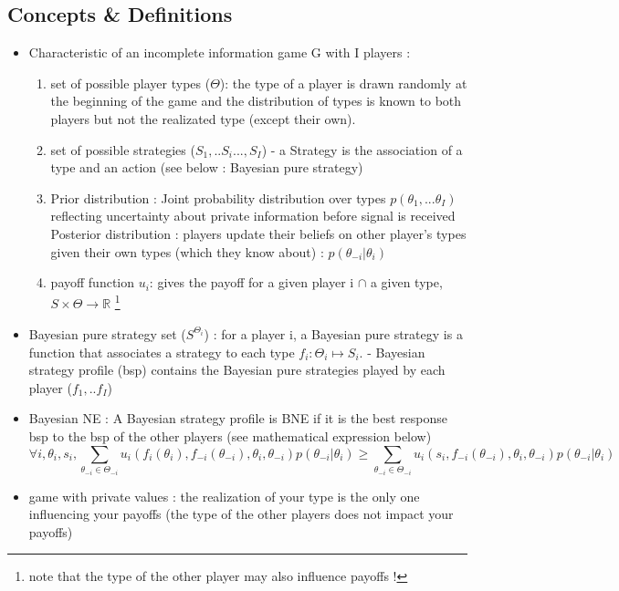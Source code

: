\documentclass{article}
\begin{document}
\subsection{Concepts \& Definitions}
\begin{itemize}
    \item Characteristic of an incomplete information game G with I players : 
    \begin{enumerate}
        \item set of possible player types ($\Theta$): the type of a player is drawn randomly at the beginning of the game and the distribution of types is known to both players but not the realizated type (except their own). 
        \item set of possible strategies ($S_1,..S_i...,S_I$)
        \subitem - a Strategy is the association of a type and an action (see below : Bayesian pure strategy)
        \item Prior distribution : Joint probability distribution over types $p(\theta_1,...\theta_I)$ reflecting uncertainty about private information before signal is received
        \subitem Posterior distribution : players update their beliefs on other player's types given their own types (which they know about) : $p(\theta_{-i}|\theta_i)$
        \item payoff function $u_i$: gives the payoff for a given player i $\cap$ a given type, $S \times\Theta\rightarrow \mathbb{R}$ \footnote{note that the type of the other player may also influence payoffs !}
    \end{enumerate} 
    \item Bayesian pure strategy set ($S^{\Theta_i}$) : for a player i, a Bayesian pure strategy is a function that associates a strategy to each type $f_i :\Theta_i \mapsto S_i$.
    \subitem - Bayesian strategy profile (bsp) contains the Bayesian pure strategies played by each player ($f_1,..f_I$) 
    \item Bayesian NE : A Bayesian strategy profile is BNE if it is the best response bsp to the bsp of the other players (see mathematical expression below)
    \begin{equation}
        \forall i ,\theta_i,s_i, \sum_{\theta_{-i} \in \Theta_{-i}} u_i(f_i(\theta_i), f_{-i}(\theta_{-i}), \theta_i, \theta_{-i})p(\theta_{-i} | \theta_i)   
\geq \sum_{\theta_{-i} \in \Theta_{-i}} u_i(s_i, f_{-i}(\theta_{-i}), \theta_i, \theta_{-i})p(\theta_{-i} | \theta_i)  
    \end{equation}
    \item game with private values : the realization of your type is the only one influencing your payoffs (the type of the other players does not impact your payoffs)
\end{itemize}
\end{document}
